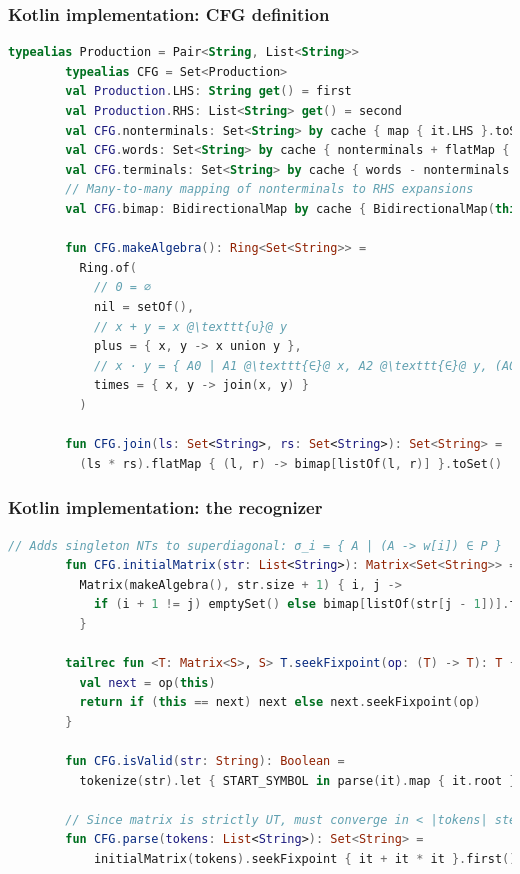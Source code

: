\documentclass{beamer}
\begin{document}
    \begin{frame}[fragile]
        \frametitle{Kotlin implementation: CFG definition}
        \begin{lstlisting}[language=Kotlin, gobble=8, basicstyle=\scriptsize\ttfamily]
        typealias Production = Pair<String, List<String>>
        typealias CFG = Set<Production>
        val Production.LHS: String get() = first
        val Production.RHS: List<String> get() = second
        val CFG.nonterminals: Set<String> by cache { map { it.LHS }.toSet() }
        val CFG.words: Set<String> by cache { nonterminals + flatMap { it.RHS } }
        val CFG.terminals: Set<String> by cache { words - nonterminals }
        // Many-to-many mapping of nonterminals to RHS expansions
        val CFG.bimap: BidirectionalMap by cache { BidirectionalMap(this) }

        fun CFG.makeAlgebra(): Ring<Set<String>> =
          Ring.of(
            // 0 = ∅
            nil = setOf(),
            // x + y = x @\texttt{∪}@ y
            plus = { x, y -> x union y },
            // x · y = { A0 | A1 @\texttt{∈}@ x, A2 @\texttt{∈}@ y, (A0 -> A1 A2) @\texttt{∈}@ P }
            times = { x, y -> join(x, y) }
          )

        fun CFG.join(ls: Set<String>, rs: Set<String>): Set<String> =
          (ls * rs).flatMap { (l, r) -> bimap[listOf(l, r)] }.toSet()
        \end{lstlisting}
    \end{frame}

    \begin{frame}[fragile]
        \frametitle{Kotlin implementation: the recognizer}
        \begin{lstlisting}[language=Kotlin, gobble=8, basicstyle=\scriptsize\ttfamily]
        // Adds singleton NTs to superdiagonal: σ_i = { A | (A -> w[i]) ∈ P }
        fun CFG.initialMatrix(str: List<String>): Matrix<Set<String>> =
          Matrix(makeAlgebra(), str.size + 1) { i, j ->
            if (i + 1 != j) emptySet() else bimap[listOf(str[j - 1])].toSet()
          }

        tailrec fun <T: Matrix<S>, S> T.seekFixpoint(op: (T) -> T): T {
          val next = op(this)
          return if (this == next) next else next.seekFixpoint(op)
        }

        fun CFG.isValid(str: String): Boolean =
          tokenize(str).let { START_SYMBOL in parse(it).map { it.root } }

        // Since matrix is strictly UT, must converge in < |tokens| steps
        fun CFG.parse(tokens: List<String>): Set<String> =
            initialMatrix(tokens).seekFixpoint { it + it * it }.first()[0]
        \end{lstlisting}
    \end{frame}
\end{document}
